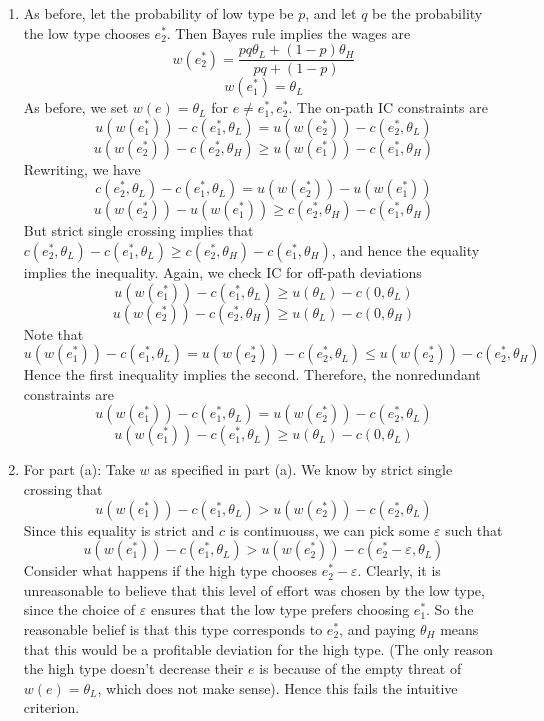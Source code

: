 \documentclass[10pt,letter]{article}
\begin{document}
\begin{enumerate}[label=(\alph*)]
\item As before, let the probability of low type be $p$, and let $q$ be the probability the low type chooses $e_2^*$. Then Bayes rule implies the wages are
\[ w(e_2^*)  =  \frac{p q \theta_L + (1-p) \theta_H}{p q  + (1-p)}  \]
\[ w(e_1^*) =\theta_L \]
As before, we set $w(e) = \theta_L$ for $e \neq e_1^*, e_2^*$. The on-path IC constraints are
\[ u(w(e_1^*)) - c(e_1^*, \theta_L) = u(w(e_2^*)) - c(e_2^*, \theta_L) \]
\[ u(w(e_2^*)) - c(e_2^*, \theta_H) \ge u(w(e_1^*)) - c(e_1^*, \theta_H) \]
Rewriting, we have
\[  c(e_2^*, \theta_L) - c(e_1^*, \theta_L) = u(w(e_2^*)) - u(w(e_1^*)) \]
\[ u(w(e_2^*)) - u(w(e_1^*))  \ge c(e_2^*, \theta_H) - c(e_1^*, \theta_H) \]
But strict single crossing implies that $c(e_2^*, \theta_L) - c(e_1^*, \theta_L) \ge c(e_2^*, \theta_H) - c(e_1^*, \theta_H)$, and hence the equality implies the inequality. Again, we check IC for off-path deviations
\[ u(w(e_1^*)) - c(e_1^*, \theta_L) \ge u(\theta_L) - c(0, \theta_L) \]
\[ u(w(e_2^*)) - c(e_2^*, \theta_H) \ge u(\theta_L) - c(0, \theta_H) \]
Note that
\[ u(w(e_1^*)) - c(e_1^*, \theta_L) = u(w(e_2^*)) - c(e_2^*, \theta_L) \le u(w(e_2^*)) - c(e_2^*, \theta_H) \]
Hence the first inequality implies the second. Therefore, the nonredundant constraints are
\[ u(w(e_1^*)) - c(e_1^*, \theta_L) = u(w(e_2^*)) - c(e_2^*, \theta_L) \]
\[ u(w(e_1^*)) - c(e_1^*, \theta_L) \ge u(\theta_L) - c(0, \theta_L) \]
\item For part (a): Take $w$ as specified in part (a). We know by strict single crossing that
\[ u(w(e_1^*)) - c(e_1^*, \theta_L) > u(w(e_2^*)) - c(e_2^*, \theta_L) \]
Since this equality is strict and $c$ is continuouss, we can pick some $\varepsilon$ such that
\[ u(w(e_1^*)) - c(e_1^*, \theta_L) > u(w(e_2^*)) - c(e_2^* - \varepsilon, \theta_L) \]
Consider what happens if the high type chooses $e_2^* - \varepsilon$. Clearly, it is unreasonable to believe that this level of effort was chosen by the low type, since the choice of $\varepsilon$ ensures that the low type prefers choosing $e_1^*$. So the reasonable belief is that this type corresponds to $e_2^*$, and paying $\theta_H$ means that this would be a profitable deviation for the high type. (The only reason the high type doesn't decrease their $e$ is because of the empty threat of $w(e) = \theta_L$, which does not make sense). Hence this fails the intuitive criterion.


\end{enumerate}
\end{document}
